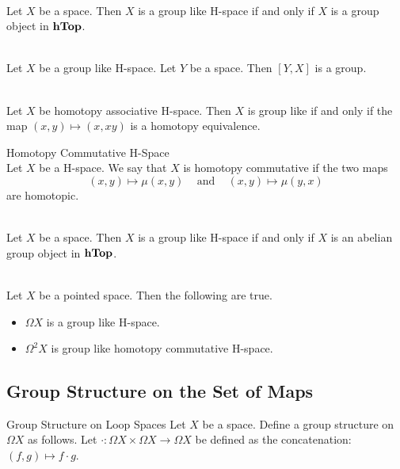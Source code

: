 \documentclass[a4paper]{article}
\begin{document}
\begin{lmm}{}{}\\
Let $X$ be a space. Then $X$ is a group like H-space if and only if $X$ is a group object in $\bold{hTop}$. 
\end{lmm}

\begin{lmm}{}{}\\
Let $X$ be a group like H-space. Let $Y$ be a space. Then $[Y,X]$ is a group. 
\end{lmm}

\begin{prp}{}{}\\
Let $X$ be homotopy associative H-space. Then $X$ is group like if and only if the map $(x,y)\mapsto(x,xy)$ is a homotopy equivalence. 
\end{prp}

\begin{defn}{Homotopy Commutative H-Space}{}\\
Let $X$ be a H-space. We say that $X$ is homotopy commutative if the two maps $$(x,y)\mapsto\mu(x,y)\;\;\;\text{ and }\;\;\;(x,y)\mapsto\mu(y,x)$$ are homotopic. 
\end{defn}

\begin{lmm}{}{}\\
Let $X$ be a space. Then $X$ is a group like H-space if and only if $X$ is an abelian group object in $\bold{hTop}$. 
\end{lmm}

\begin{prp}{}{}\\
Let $X$ be a pointed space. Then the following are true. 
\begin{itemize}
\item $\Omega X$ is a group like H-space. 
\item $\Omega^2X$ is group like homotopy commutative H-space. 
\end{itemize}
\end{prp}

\subsection{Group Structure on the Set of Maps}
\begin{defn}{Group Structure on Loop Spaces}{} Let $X$ be a space. Define a group structure on $\Omega X$ as follows. Let $\cdot:\Omega X\times\Omega X\to\Omega X$ be defined as the concatenation: $(f,g)\mapsto f\cdot g$. 
\end{defn}
\end{document}
